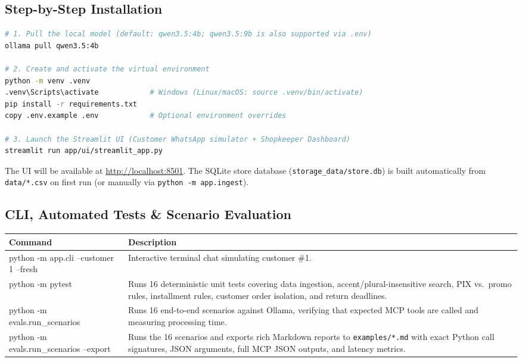 \documentclass[11pt,a4paper]{article}
\begin{document}
\subsection{Step-by-Step Installation}
\begin{lstlisting}[language=bash]
# 1. Pull the local model (default: qwen3.5:4b; qwen3.5:9b is also supported via .env)
ollama pull qwen3.5:4b

# 2. Create and activate the virtual environment
python -m venv .venv
.venv\Scripts\activate            # Windows (Linux/macOS: source .venv/bin/activate)
pip install -r requirements.txt
copy .env.example .env            # Optional environment overrides

# 3. Launch the Streamlit UI (Customer WhatsApp simulator + Shopkeeper Dashboard)
streamlit run app/ui/streamlit_app.py
\end{lstlisting}
The UI will be available at \url{http://localhost:8501}. The SQLite store database (\texttt{storage\_data/\allowbreak store.db}) is built automatically from \texttt{data/*.csv} on first run (or manually via \texttt{python -m app.ingest}).

\subsection{CLI, Automated Tests \& Scenario Evaluation}
\begin{tabularx}{\textwidth}{>{\ttfamily\footnotesize\raggedright\arraybackslash}p{5.8cm} >{\raggedright\arraybackslash}X}
\toprule
\textbf{\normalfont\bfseries Command} & \textbf{Description} \\
\midrule
python -m app.cli --customer 1 --fresh & Interactive terminal chat simulating customer \#1. \\
\addlinespace[2pt]
python -m pytest & Runs 16 deterministic unit tests covering data ingestion, accent/plural-insensitive search, PIX vs.\ promo rules, installment rules, customer order isolation, and return deadlines. \\
\addlinespace[2pt]
python -m evals.run\_scenarios & Runs 16 end-to-end scenarios against Ollama, verifying that expected MCP tools are called and measuring processing time. \\
\addlinespace[2pt]
python -m evals.run\_scenarios --export & Runs the 16 scenarios and exports rich Markdown reports to \texttt{examples/*.md} with exact Python call signatures, JSON arguments, full MCP JSON outputs, and latency metrics. \\
\bottomrule
\end{tabularx}
\end{document}
